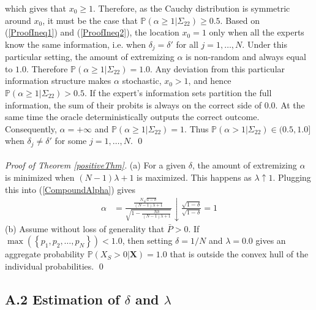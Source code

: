 \documentclass[11pt]{article}
\renewcommand{\P}{\mathbb{P}}
\theoremstyle{definition}
\theoremstyle{definition}
\begin{document}
which gives that $x_0 \geq 1$. Therefore, as the Cauchy distribution is symmetric around $x_0$, it must be the case that $\P(\alpha \geq 1 | \Sigma_{22}) \geq 0.5$. Based on (\ref{ProofIneq1}) and (\ref{ProofIneq2}), the location $x_0 = 1$ only when all the experts know the same information, i.e. when $\delta_j = \delta'$ for all $j = 1, \dots, N$. Under this particular setting, the amount of extremizing $\alpha$ is non-random and always equal to $1.0$. Therefore $\P(\alpha \geq 1 | \Sigma_{22}) = 1.0$.  Any deviation from this particular information structure makes $\alpha$ stochastic, $x_0 > 1$, and hence $\P(\alpha \geq 1 | \Sigma_{22}) > 0.5$. If the expert's information sets partition the full information, the sum of their probits is always on the correct side of $0.0$. At the same time the oracle deterministically outputs the correct outcome. Consequently, $\alpha = +\infty$ and $\P(\alpha \geq 1 | \Sigma_{22}) = 1$. Thus $\P(\alpha > 1 | \Sigma_{22}) \in (0.5, 1.0]$ when $\delta_j \neq \delta'$ for some $j = 1, \dots, N$. \qed
\\
\\
\noindent
\textit{Proof of Theorem \ref{positiveThm}.} (a) For a given $\delta$, the amount of extremizing $\alpha$ is minimized when $(N-1)\lambda +1$ is maximized. This happens as $\lambda \uparrow 1$. Plugging this into (\ref{CompoundAlpha}) gives
\begin{align*}
\alpha &= \frac{\frac{N\sqrt{1-\delta}}{(N-1)\lambda +1}}{\sqrt{1- \frac{N\delta}{(N-1)\lambda +1} }}  \downarrow \frac{\sqrt{1-\delta}}{\sqrt{1-\delta }} = 1
\end{align*}
(b) Assume without loss of generality that $\bar{P} > 0$. If $\max(\left\{p_1, p_2, \dots, p_N \right\}) < 1.0$, then  setting $\delta = 1/N$ and $\lambda = 0.0$ gives an aggregate probability $\P\left(X_S > 0 | \boldsymbol{X}\right) = 1.0$ that is outside the convex hull of the individual probabilities.
\qed

\subsection*{A.2 Estimation of $\delta$ and $\lambda$}
\end{document}

